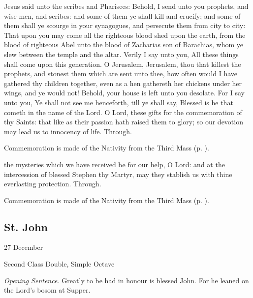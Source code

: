  Jesus said unto the scribes and Pharisees: Behold, I send unto you prophets, and wise men, and scribes: and some of them ye shall kill and crucify; and some of them shall ye scourge in your synagogues, and persecute them from city to city: That upon you may come all the righteous blood shed upon the earth, from the blood of righteous Abel unto the blood of Zacharias son of Barachias, whom ye slew between the temple and the altar. Verily I say unto you, All these things shall come upon this generation. O Jerusalem, Jerusalem, thou that killest the prophets, and stonest them which are sent unto thee, how often would I have gathered thy children together, even as a hen gathereth her chickens under her wings, and ye would not! Behold, your house is left unto you desolate. For I say unto you, Ye shall not see me henceforth, till ye shall say, Blessed is he that cometh in the name of the Lord.
\secret
{} O Lord, these gifts for the commemoration of thy Saints: that like as their passion hath raised them to glory; so our devotion may lead us to innocency of life. Through.
\begin{rubric}
    Commemoration is made of the Nativity from the Third Mass (p. \pageref{NativityMassIIISecret}).
\end{rubric}
\postcommunion
{} the mysteries which we have received be for our help, O Lord: and at the intercession of blessed Stephen thy Martyr, may they stablish us with thine everlasting protection. Through.
\begin{rubric}
    Commemoration is made of the Nativity from the Third Mass (p. \pageref{NativityMassIIIPostcommunion}).
\end{rubric}


\clearpage
\subsection{St. John}
\begin{inhead}
{27 December}\par
{Second Class Double, Simple Octave}
\end{inhead}
\par\noindent
\textit{Opening Sentence.} Greatly to be had in honour is blessed John. For he leaned on the Lord's bosom at Supper.

